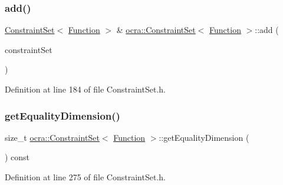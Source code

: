 \subsubsection{\texorpdfstring{add()}{add()}\hspace{0.1cm}{\footnotesize\ttfamily [2/2]}}
{\footnotesize\ttfamily \hyperlink{classocra_1_1ConstraintSet}{Constraint\+Set}$<$ \hyperlink{classocra_1_1Function}{Function} $>$ \& \hyperlink{classocra_1_1ConstraintSet}{ocra\+::\+Constraint\+Set}$<$ \hyperlink{classocra_1_1Function}{Function} $>$\+::add (\begin{DoxyParamCaption}\item[{\hyperlink{classocra_1_1ConstraintSet}{Constraint\+Set}$<$ \hyperlink{classocra_1_1Function}{Function} $>$ \&}]{constraint\+Set }\end{DoxyParamCaption})\hspace{0.3cm}{\ttfamily [inline]}}



Definition at line 184 of file Constraint\+Set.\+h.

\hypertarget{classocra_1_1ConstraintSet_3_01Function_01_4_a28e616efa34ce7f07850557ff3cf96c1}{}\label{classocra_1_1ConstraintSet_3_01Function_01_4_a28e616efa34ce7f07850557ff3cf96c1} 
\subsubsection{\texorpdfstring{get\+Equality\+Dimension()}{getEqualityDimension()}}
{\footnotesize\ttfamily size\+\_\+t \hyperlink{classocra_1_1ConstraintSet}{ocra\+::\+Constraint\+Set}$<$ \hyperlink{classocra_1_1Function}{Function} $>$\+::get\+Equality\+Dimension (\begin{DoxyParamCaption}{ }\end{DoxyParamCaption}) const\hspace{0.3cm}{\ttfamily [inline]}}



Definition at line 275 of file Constraint\+Set.\+h.

\hypertarget{classocra_1_1ConstraintSet_3_01Function_01_4_a3ee3679abafd62c5c860a812da46411c}{}\label{classocra_1_1ConstraintSet_3_01Function_01_4_a3ee3679abafd62c5c860a812da46411c} 
